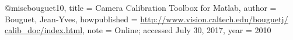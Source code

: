 @misc{bouguet10,
  title        = {{C}amera {C}alibration {T}oolbox for {M}atlab},
  author       = {Bouguet, Jean-Yves},
  howpublished = {\url{http://www.vision.caltech.edu/bouguetj/
                  calib\_doc/index.html}},
  note         = {Online; accessed July 30, 2017},
  year         = {2010}
}
